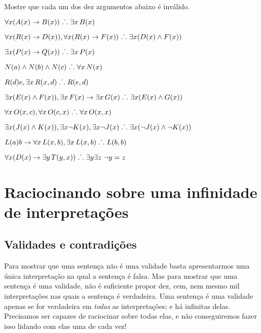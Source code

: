 \problempart
Mostre que cada um dos dez argumentos abaixo é inválido.
\begin{earg}
\item $\forall x(\mathord{A}(x) \rightarrow \mathord{B}(x)) \mathrel{\ldotp\dot{}\,\ldotp} \exists x\, \mathord{B}(x)$
\item $\forall x(\mathord{R}(x) \rightarrow \mathord{D}(x)), \forall x(\mathord{R}(x) \rightarrow \mathord{F}(x)) \mathrel{\ldotp\dot{}\,\ldotp} \exists x(\mathord{D}(x) \wedge \mathord{F}(x))$
\item $\exists x(\mathord{P}(x)\rightarrow \mathord{Q}(x)) \mathrel{\ldotp\dot{}\,\ldotp} \exists x\, \mathord{P}(x)$
\item $\mathord{N}(a) \wedge \mathord{N}(b) \wedge \mathord{N}(c) \mathrel{\ldotp\dot{}\,\ldotp} \forall x\, \mathord{N}(x)$
\item $\mathord{R}(d)e, \exists x\, \mathord{R}(x,d) \mathrel{\ldotp\dot{}\,\ldotp} \mathord{R}(e,d)$
\item $\exists x(\mathord{E}(x) \wedge \mathord{F}(x)), \exists x\, \mathord{F}(x) \rightarrow \exists x\, \mathord{G}(x) \mathrel{\ldotp\dot{}\,\ldotp} \exists x(\mathord{E}(x) \wedge \mathord{G}(x))$
\item $\forall x\, \mathord{O}(x,c), \forall x\, \mathord{O}(c,x) \mathrel{\ldotp\dot{}\,\ldotp} \forall x\, \mathord{O}(x,x)$
\item $\exists x(\mathord{J}(x) \wedge \mathord{K}(x)), \exists x \neg \mathord{K}(x), \exists x \neg \mathord{J}(x) \mathrel{\ldotp\dot{}\,\ldotp} \exists x(\neg \mathord{J}(x) \wedge \neg \mathord{K}(x))$
\item $\mathord{L}(a)b \rightarrow \forall x\, \mathord{L}(x,b), \exists x\, \mathord{L}(x,b) \mathrel{\ldotp\dot{}\,\ldotp} \mathord{L}(b,b)$
\item $\forall x(\mathord{D}(x) \rightarrow \exists y\, \mathord{T}(y,x)) \mathrel{\ldotp\dot{}\,\ldotp} \exists y \exists z\ \neg y= z$
\end{earg}


\chapter[Infinitas interpretações]{Raciocinando sobre uma infinidade de interpretações}\label{s:InfinitInterpret}

\section{Validades e contradições}
Para mostrar que uma sentença não é uma validade basta apresentarmos uma única interpretação na qual a sentença é falsa.
Mas para mostrar que uma sentença é uma validade, não é suficiente propor dez, cem, nem mesmo mil interpretações nas quais a sentença é verdadeira.
Uma sentença é uma validade apenas se for verdadeira em \emph{todas} as interpretações; e há infinitas delas.
Precisamos ser capazes de raciocinar sobre todas elas, e não conseguiremos fazer isso lidando com elas uma de cada vez!


